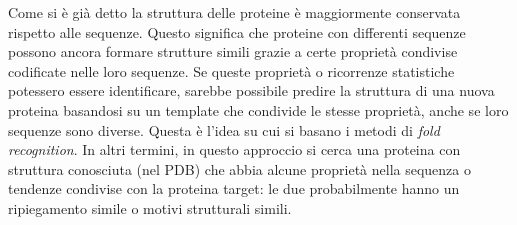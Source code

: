 {Come si è già detto la struttura delle proteine è maggiormente conservata rispetto alle sequenze. Questo significa che proteine con differenti sequenze possono ancora formare strutture simili grazie a certe proprietà condivise codificate nelle loro sequenze. Se queste proprietà o ricorrenze statistiche potessero essere identificare, sarebbe possibile predire la struttura di una nuova proteina basandosi su un template che condivide le stesse proprietà, anche se loro sequenze sono diverse. Questa è l'idea su cui si basano i metodi di \textit{fold recognition}. 
In altri termini, in questo approccio si cerca una proteina con struttura conosciuta (nel PDB) che abbia alcune proprietà nella sequenza o tendenze condivise con la proteina target: le due probabilmente hanno un ripiegamento simile o motivi strutturali simili.
}

